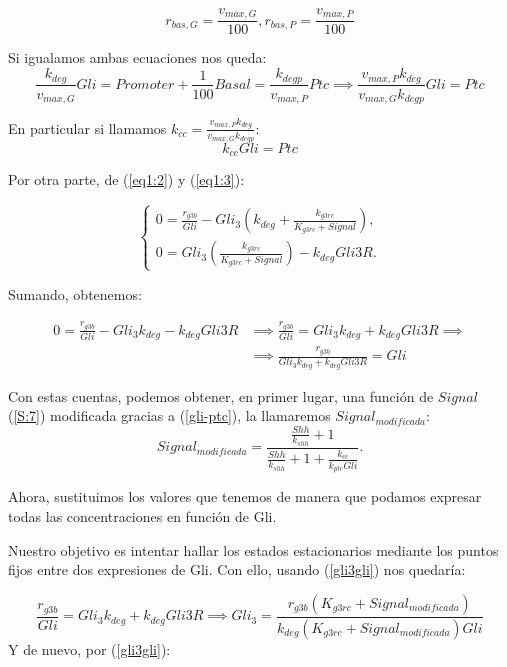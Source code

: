 $$
r_{bas,G}=\frac{v_{max,G}}{100},r_{bas,P}=\frac{v_{max,P}}{100}
$$

Si igualamos ambas ecuaciones nos queda:
\begin{equation*}
\frac{k_{deg}}{v_{max,G}}Gli=Promoter+\frac{1}{100}Basal=\frac{k_{degp}}{v_{max,P}}Ptc \implies \frac{v_{max,P}k_{deg}}{v_{max,G}k_{degp}}Gli=Ptc
\end{equation*}

 En particular si llamamos $k_{cc}=\frac{v_{max,P}k_{deg}}{v_{max,G}k_{degp}}$:
 \begin{equation}
k_{cc}Gli=Ptc
\label{gli-ptc}
 \end{equation}


Por otra parte, de (\ref{eq1:2}) y (\ref{eq1:3}):



$$\begin{cases} 0 = \frac{r_{g3b}}{Gli}-Gli_3\left(k_{deg}+\frac{k_{g3rc}}{K_{g3rc}+Signal}\right), \\0=Gli_3\left(\frac{k_{g3rc}}{K_{g3rc}+Signal}\right)-k_{deg}Gli3R. \end{cases}$$

Sumando, obtenemos:

\begin{equation}
\begin{split}
0=\frac{r_{g3b}}{Gli}-Gli_3k_{deg}-k_{deg}Gli3R & \implies \frac{r_{g3b}}{Gli}=Gli_3k_{deg}+k_{deg}Gli3R\implies
\\
& \implies \frac{r_{g3b}}{Gli_3k_{deg}+k_{deg}Gli3R}=Gli
\end{split}
\label{gli3gli}
\end{equation}

Con estas cuentas, podemos obtener, en primer lugar, una función de $Signal$ (\ref{S:7}) modificada gracias a (\ref{gli-ptc}), la llamaremos $Signal_{modificada}$:
\begin{equation}
Signal_{modificada}=\frac{\frac{Shh}{k_{shh}} + 1}{\frac{Shh}{k_{shh}} + 1 + \frac{k_{cc}}{k_{ptc}Gli}}.
\end{equation}

Ahora, sustituimos los valores que tenemos de manera que podamos expresar todas las concentraciones en función de Gli. 

Nuestro objetivo es intentar hallar los estados estacionarios mediante los puntos fijos entre dos expresiones de Gli. Con ello, usando (\ref{gli3gli}) nos quedaría:

\begin{equation}
 \frac{r_{g3b}}{Gli}=Gli_3k_{deg}+k_{deg}Gli3R
 \implies Gli_3=\frac{r_{g3b}(K_{g3rc}+Signal_{modificada})}{k_{deg}(K_{g3rc}+Signal_{modificada})Gli}
\label{equgli3}
\end{equation}
 Y de nuevo, por  (\ref{gli3gli}):
 
